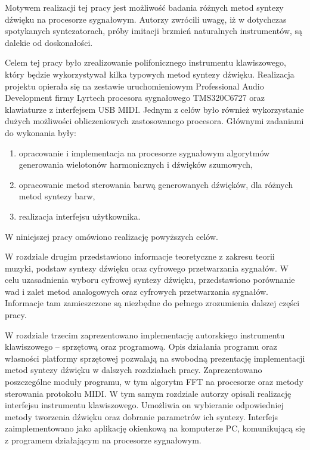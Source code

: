 Motywem realizacji tej pracy jest możliwość badania różnych metod syntezy dźwięku na procesorze sygnałowym. 
Autorzy zwrócili uwagę, iż w dotychczas spotykanych syntezatorach, próby imitacji brzmień naturalnych instrumentów, są dalekie od doskonałości.

Celem tej pracy było zrealizowanie polifonicznego instrumentu klawiszowego, który będzie wykorzystywał kilka typowych metod syntezy dźwięku. Realizacja projektu opierała się na zestawie uruchomieniowym Professional Audio Development firmy Lyrtech procesora sygnałowego TMS320C6727 oraz klawiaturze z interfejsem USB MIDI. Jednym z celów było również wykorzystanie dużych możliwości obliczeniowych zastosowanego procesora. Głównymi zadaniami do wykonania były:

\begin{enumerate}
    \item opracowanie i implementacja na procesorze sygnałowym algorytmów generowania wielotonów harmonicznych i dźwięków szumowych,
    
    \item opracowanie metod sterowania barwą generowanych dźwięków, dla różnych metod syntezy barw,
    
    \item realizacja interfejsu użytkownika.
\end{enumerate}
W niniejszej pracy omówiono realizację powyższych celów.

W rozdziale drugim przedstawiono informacje teoretyczne z zakresu teorii muzyki, podstaw syntezy dźwięku oraz cyfrowego przetwarzania sygnałów. W celu uzasadnienia wyboru cyfrowej syntezy dźwięku, przedstawiono porównanie wad i zalet metod analogowych oraz cyfrowych przetwarzania sygnałów. Informacje tam zamieszczone są niezbędne do pełnego zrozumienia dalszej części pracy.

W rozdziale trzecim zaprezentowano implementację autorskiego instrumentu klawiszowego – sprzętową oraz programową. Opis działania programu oraz własności platformy sprzętowej pozwalają na swobodną prezentację implementacji metod syntezy dźwięku w dalszych rozdziałach pracy. Zaprezentowano poszczególne moduły programu, w tym algorytm FFT na procesorze oraz metody sterowania protokołu MIDI. W tym samym rozdziale autorzy opisali realizację interfejsu instrumentu klawiszowego. Umożliwia on wybieranie odpowiedniej metody tworzenia dźwięku oraz dobranie parametrów ich syntezy. Interfejs zaimplementowano jako aplikację okienkową na komputerze PC, komunikującą się z programem działającym na procesorze sygnałowym.

